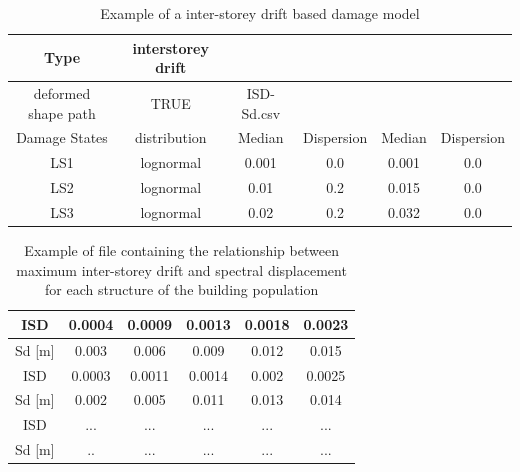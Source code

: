 \begin {table}[htb]
\caption{Example of a inter-storey drift based damage model}
\label{table:isd-dmg}
\begin{center}
  \begin{tabular}{ | c | c | c | c | c | c |}
  \hline
    Type & interstorey drift &  &  & & \\ \hline
    deformed shape path & TRUE & ISD-Sd.csv  &  & & \\ \hline
    Damage States & distribution & Median & Dispersion & Median & Dispersion \\ \hline
    LS1 & lognormal & 0.001 & 0.0 & 0.001 & 0.0 \\ \hline
    LS2 & lognormal & 0.01  & 0.2 & 0.015 & 0.0 \\ \hline
    LS3 & lognormal & 0.02  & 0.2 & 0.032 & 0.0 \\ \hline
  \end{tabular}
\end{center}
\end{table}

\begin {table}[htb]
\caption{Example of file containing the relationship between maximum inter-storey drift and spectral displacement for each structure of the building population}
\label{table:isd-sd}
\begin{center}
  \begin{tabular}{ | c | c | c | c | c | c |}
  \hline
    ISD & 0.0004 & 0.0009 & 0.0013 &	0.0018 & 0.0023 \\ \hline
    Sd [m] & 0.003 &	0.006 & 0.009 &	0.012 &	0.015 \\ \hline
    ISD & 0.0003 & 0.0011 & 0.0014 &	0.002 & 0.0025 \\ \hline
    Sd [m] & 0.002 &	0.005 & 0.011 &	0.013 &	0.014 \\ \hline
    ISD & ... & ... & ... &	... & ... \\ \hline
    Sd [m] & .. &... & ... &... &... \\ \hline
  \end{tabular}
\end{center}
\end{table}